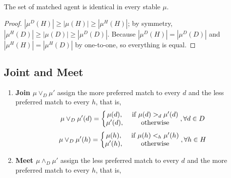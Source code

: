 \documentclass[11pt]{elegantbook}
\begin{document}
\begin{theorem}
    The set of matched agent is identical in every stable $\mu$.
\end{theorem}
\begin{proof}
    $|\mu^D(H)|\geq |\mu(H)|\geq |\mu^H(H)|$; by symmetry, $|\mu^H(D)|\geq |\mu(D)|\geq |\mu^D(D)|$. Because $|\mu^D(H)|=|\mu^D(D)|$ and $|\mu^H(H)|=|\mu^H(D)|$ by one-to-one, so everything is equal.
\end{proof}

\subsection{Joint and Meet}
\begin{definition}
    \normalfont
    \begin{enumerate}
        \item \textbf{Join $\mu \vee_D \mu'$} assign the more preferred match to every $d$ and the less preferred match to every $h$, that is,
        \begin{equation}
            \begin{aligned}
                \mu \vee_D \mu'(d)=\left\{\begin{matrix}
                    \mu(d),&\textnormal{ if }\mu(d)>_d\mu'(d)\\
                    \mu'(d),&\textnormal{ otherwise}
                \end{matrix}\right., \forall d\in D
            \end{aligned}
            \nonumber
        \end{equation}
        \begin{equation}
            \begin{aligned}
                \mu \vee_D \mu'(h)=\left\{\begin{matrix}
                    \mu(h),&\textnormal{ if }\mu(h)<_h\mu'(h)\\
                    \mu'(h),&\textnormal{ otherwise}
                \end{matrix}\right., \forall h\in H
            \end{aligned}
            \nonumber
        \end{equation}
        \item \textbf{Meet $\mu\wedge_D\mu'$} assign the less preferred match to every $d$ and the more preferred match to every $h$, that is,
        \begin{equation}
            \begin{aligned}

\end{aligned}
\end{equation}
\end{enumerate}
\end{definition}
\end{document}
